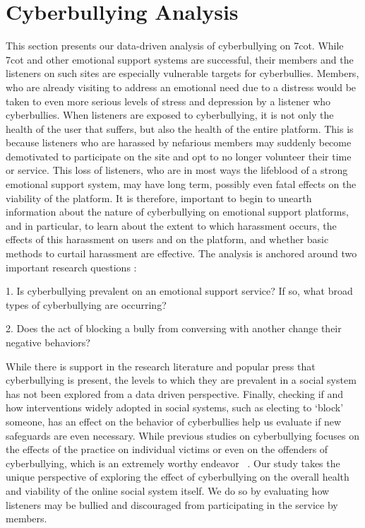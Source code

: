 \chapter{Cyberbullying Analysis}


This section presents our data-driven analysis of cyberbullying on 7cot. While 7cot and other emotional support systems are successful, their members and the listeners on such sites are especially vulnerable targets for cyberbullies. Members, who are already visiting to address an emotional need due to a distress would be taken to even more serious levels of stress and depression by a listener who cyberbullies. When listeners are exposed to cyberbullying, it is not only the health of the user that suffers, but also the health of the entire platform. This is because listeners who are harassed by nefarious members may suddenly become demotivated to participate on the site and opt to no longer volunteer their time or service. This loss of listeners, who are in most ways the lifeblood of a strong emotional support system, may have long term, possibly even fatal effects on the viability of the platform. It is therefore, important to begin to unearth information about the nature of cyberbullying on emotional support platforms, and in particular, to learn about the extent to which harassment occurs, the effects of this harassment on users and on the platform, and whether basic methods to curtail harassment are effective. The analysis is anchored around two important research questions :

1. Is cyberbullying prevalent on an emotional support service? If so, what broad types of cyberbullying are occurring?

2. Does the act of blocking a bully from conversing with another change their negative behaviors?

While there is support in the research literature and popular press that cyberbullying is present, the levels to which they are prevalent in a social system has not been explored from a data driven perspective. Finally, checking if and how interventions widely adopted in social systems, such as electing to ‘block’ someone, has an effect on the behavior of cyberbullies help us evaluate if new safeguards are even necessary. While previous studies on cyberbullying focuses on the effects of the practice on individual victims or even on the offenders of cyberbullying, which is an extremely worthy endeavor ~\cite{hinduja2010bullying}. Our study takes the unique perspective of exploring the effect of cyberbullying on the overall health and viability of the online social system itself. We do so by evaluating how listeners may be bullied and discouraged from participating in the service by members.

